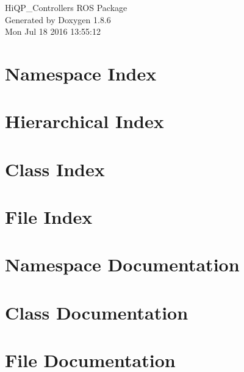 \documentclass[twoside]{book}
\newcommand{\clearemptydoublepage}{%
  \newpage{\pagestyle{empty}\cleardoublepage}%
}
\begin{document}
\hypersetup{pageanchor=false}
\begin{titlepage}
\vspace*{7cm}
\begin{center}%
{\Large Hi\-Q\-P\-\_\-\-Controllers R\-O\-S Package }\\
\vspace*{1cm}
{\large Generated by Doxygen 1.8.6}\\
\vspace*{0.5cm}
{\small Mon Jul 18 2016 13:55:12}\\
\end{center}
\end{titlepage}
\clearemptydoublepage
\tableofcontents
\clearemptydoublepage
{}
\hypersetup{pageanchor=true}

\chapter{Namespace Index}

\chapter{Hierarchical Index}

\chapter{Class Index}

\chapter{File Index}

\chapter{Namespace Documentation}

\chapter{Class Documentation}









\chapter{File Documentation}















\newpage
{}
{}
\printindex
\end{document}
